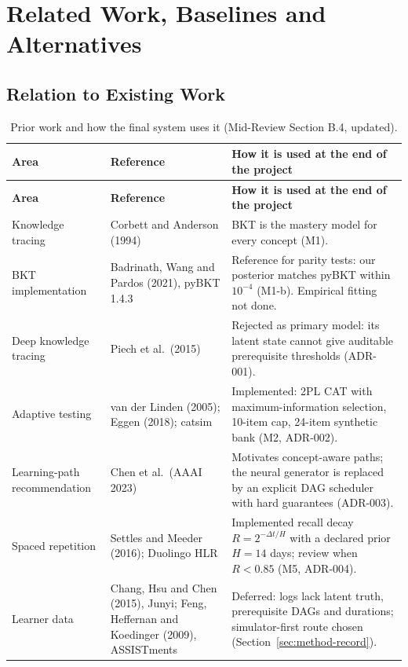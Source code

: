 \documentclass[english]{sintr}
\begin{document}
\section{Related Work, Baselines and Alternatives}
\subsection{Relation to Existing Work}
{\small
\begin{longtable}{|L{2.76cm}|L{3.99cm}|L{8.28cm}|}
\caption{Prior work and how the final system uses it (Mid-Review Section B.4, updated).}\\
\hline
\textbf{Area} & \textbf{Reference} & \textbf{How it is used at the end of the project} \\ \hline
\endfirsthead
\hline \textbf{Area} & \textbf{Reference} & \textbf{How it is used at the end of the project} \\ \hline
\endhead
Knowledge tracing & Corbett and Anderson (1994) & BKT is the mastery model for every concept (M1). \\ \hline
BKT implementation & Badrinath, Wang and Pardos (2021), pyBKT 1.4.3 & Reference for parity tests: our posterior matches pyBKT within $10^{-4}$ (M1-b). Empirical fitting not done. \\ \hline
Deep knowledge tracing & Piech et al.\ (2015) & Rejected as primary model: its latent state cannot give auditable prerequisite thresholds (ADR-001). \\ \hline
Adaptive testing & van der Linden (2005); Eggen (2018); catsim & Implemented: 2PL CAT with maximum-information selection, 10-item cap, 24-item synthetic bank (M2, ADR-002). \\ \hline
Learning-path recommendation & Chen et al.\ (AAAI 2023) & Motivates concept-aware paths; the neural generator is replaced by an explicit DAG scheduler with hard guarantees (ADR-003). \\ \hline
Spaced repetition & Settles and Meeder (2016); Duolingo HLR & Implemented recall decay $R = 2^{-\Delta t/H}$ with a declared prior $H = 14$ days; review when $R < 0.85$ (M5, ADR-004). \\ \hline
Learner data & Chang, Hsu and Chen (2015), Junyi; Feng, Heffernan and Koedinger (2009), ASSISTments & Deferred: logs lack latent truth, prerequisite DAGs and durations; simulator-first route chosen (Section~\ref{sec:method-record}). \\ \hline
\end{longtable}
}
\newpage
\end{document}
